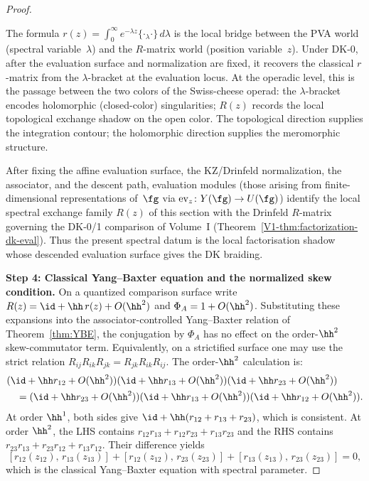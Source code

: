\begin{proof}
\begin{remark}
The formula $r(z) = \int_0^\infty e^{-\lambda z} \{\cdot{}_\lambda \cdot\}\, d\lambda$ is the local bridge between the PVA world (spectral variable~$\lambda$) and the $R$-matrix world (position variable~$z$). Under DK-0, after the evaluation surface and normalization are fixed, it recovers the classical $r$-matrix from the $\lambda$-bracket at the evaluation locus. At the operadic level, this is the passage between the two colors of the Swiss-cheese operad: the $\lambda$-bracket encodes holomorphic (closed-color) singularities; $R(z)$ records the local topological exchange shadow on the open color. The topological direction supplies the integration contour; the holomorphic direction supplies the meromorphic structure.
\end{remark}

\begin{remark}
After fixing the affine evaluation surface, the KZ/Drinfeld
normalization, the associator, and the descent path, evaluation modules
(those arising from finite-dimensional representations of~$\fg$ via
$\mathrm{ev}_z \colon Y(\fg) \to U(\fg)$) identify the local spectral
exchange family \(R(z)\) of this section with the Drinfeld \(R\)-matrix
governing the DK-0/1 comparison of Volume~I
(Theorem~\ref*{V1-thm:factorization-dk-eval}). Thus the present
spectral datum is the local factorisation shadow whose descended
evaluation surface gives the DK braiding.
\end{remark}

\medskip
\noindent\textbf{Step 4: Classical Yang--Baxter equation and the normalized skew condition.}
On a quantized comparison surface write
$R(z)=\id+\hh\,r(z)+O(\hh^2)$ and
$\Phi_A=1+O(\hh^2)$.  Substituting these expansions into the
associator-controlled Yang--Baxter relation of
Theorem~\ref{thm:YBE}, the conjugation by \(\Phi_A\) has no effect on
the order-\(\hh^2\) skew-commutator term.  Equivalently, on a
strictified surface one may use the strict relation
$R_{ij}R_{ik}R_{jk}=R_{jk}R_{ik}R_{ij}$.  The order-\(\hh^2\)
calculation is:
\begin{align*}
&(\id + \hh r_{12} + O(\hh^2))(\id + \hh r_{13} + O(\hh^2))(\id + \hh r_{23} + O(\hh^2)) \\
&\quad = (\id + \hh r_{23} + O(\hh^2))(\id + \hh r_{13} + O(\hh^2))(\id + \hh r_{12} + O(\hh^2)).
\end{align*}
At order $\hh^1$, both sides give $\id + \hh(r_{12} + r_{13} + r_{23})$, which is consistent. At order $\hh^2$, the LHS contains $r_{12}r_{13} + r_{12}r_{23} + r_{13}r_{23}$ and the RHS contains $r_{23}r_{13} + r_{23}r_{12} + r_{13}r_{12}$. Their difference yields
\[
[r_{12}(z_{12}),\, r_{13}(z_{13})] + [r_{12}(z_{12}),\, r_{23}(z_{23})] + [r_{13}(z_{13}),\, r_{23}(z_{23})] = 0,
\]
which is the classical Yang--Baxter equation with spectral parameter.


\end{proof}
